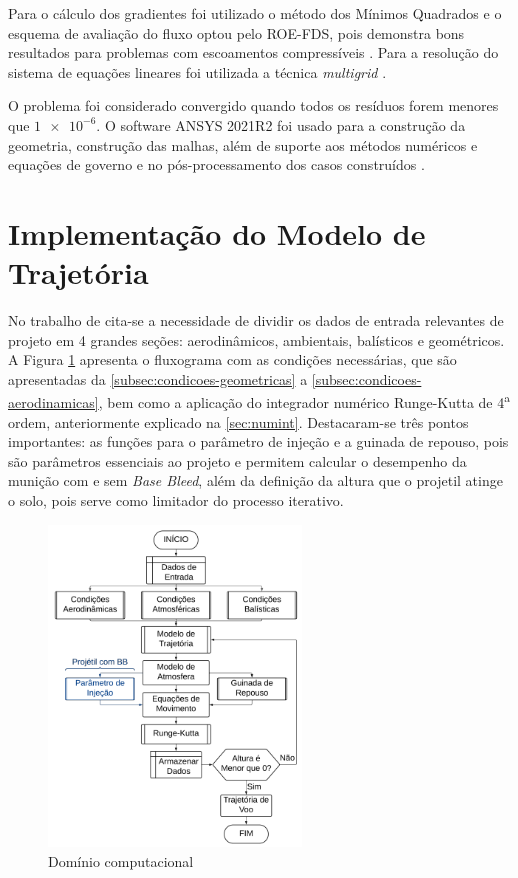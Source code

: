 Para o cálculo dos gradientes foi utilizado o método dos Mínimos Quadrados e o esquema de avaliação do fluxo optou pelo ROE-FDS, pois demonstra bons resultados para problemas com escoamentos compressíveis \cite{nicolas-perez_accuracy_2017}. Para a resolução do sistema de equações lineares foi utilizada a técnica \textit{multigrid} \cite{Hutchinson1986}.

O problema foi considerado convergido quando todos os resíduos forem menores que \(\num{1e-6}\). O software ANSYS 2021R2 foi usado para a construção da geometria, construção das malhas, além de suporte aos métodos numéricos e equações de governo e no pós-processamento dos casos construídos \cite{fluent2021ansys}.

\section{Implementação do Modelo de Trajetória}\label{subsec:implementacao-trajetoria}

No trabalho de \citeauthor{Rosendo2020} cita-se a necessidade de dividir os dados de entrada relevantes de projeto em 4 grandes seções: aerodinâmicos, ambientais, balísticos e geométricos. A Figura \ref{fig:fluxograma-mpmtm} apresenta o fluxograma com as condições necessárias, que são apresentadas da \autoref{subsec:condicoes-geometricas} a \autoref{subsec:condicoes-aerodinamicas}, bem como a aplicação do integrador numérico Runge-Kutta de 4\textsuperscript{a} ordem, anteriormente explicado na \autoref{sec:numint}. Destacaram-se três pontos importantes: as funções para o parâmetro de injeção e a guinada de repouso, pois são parâmetros essenciais ao projeto e permitem calcular o desempenho da munição com e sem \textit{Base Bleed}, além da definição da altura que o projetil atinge o solo, pois serve como limitador do processo iterativo. 

\begin{figure}[!ht]
	\centering
	\includegraphics[width=0.6\textwidth]{foto03-fluxograma-mpmtm.png}
	\caption{Domínio computacional}
	\label{fig:fluxograma-mpmtm}
\end{figure}

